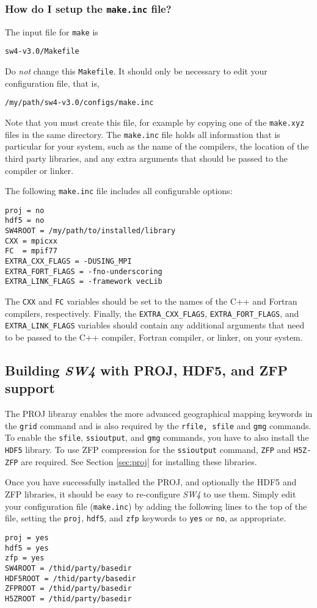 \documentclass[11pt]{article}
\begin{document}
\subsubsection{How do I setup the {\tt make.inc} file?}

The input file for \verb+make+ is
\begin{verbatim}
sw4-v3.0/Makefile
\end{verbatim}
Do {\em not} change this \verb+Makefile+. It should only be necessary to edit your configuration
file, that is,
\begin{verbatim}
/my/path/sw4-v3.0/configs/make.inc
\end{verbatim}
Note that you must create this file, for example by copying one of the \verb+make.xyz+ files in the
same directory. The \verb+make.inc+ file holds all information that is particular for your system,
such as the name of the compilers, the location of the third party libraries, and any extra
arguments that should be passed to the compiler or linker. 

The following \verb+make.inc+ file includes all configurable options:
\begin{verbatim}
proj = no
hdf5 = no
SW4ROOT = /my/path/to/installed/library
CXX = mpicxx
FC  = mpif77
EXTRA_CXX_FLAGS = -DUSING_MPI
EXTRA_FORT_FLAGS = -fno-underscoring
EXTRA_LINK_FLAGS = -framework vecLib
\end{verbatim}
The \verb+CXX+ and \verb+FC+ variables should be set to the names of the C++ and
Fortran compilers, respectively. Finally, the \verb+EXTRA_CXX_FLAGS+, \verb+EXTRA_FORT_FLAGS+, and
\verb+EXTRA_LINK_FLAGS+ variables should contain any additional arguments that need to be passed to
the C++ compiler, Fortran compiler, or linker, on your system.

\subsection{Building \emph{SW4} with PROJ, HDF5, and ZFP support}
The PROJ libraray enables the more advanced geographical mapping keywords in the {\tt grid} command and is also required by the {\tt rfile, sfile} and {\tt gmg} commands. To enable the {\tt sfile}, {\tt ssioutput}, and {\tt gmg} commands, you have to also install the {\tt HDF5} library. To use ZFP compression for the {\tt ssioutput} command, {\tt ZFP} and {\tt H5Z-ZFP} are required. See Section \ref{sec:proj} for installing these libraries.

Once you have successfully installed the PROJ, and optionally the HDF5 and ZFP libraries, it should be easy to re-configure \emph{SW4} to use them. Simply edit your configuration file (\verb+make.inc+) by adding the following lines to the top of the file, setting the {\tt proj}, {\tt hdf5}, and {\tt zfp} keywords to
{\tt yes} or {\tt no}, as appropriate.
\begin{verbatim}
proj = yes 
hdf5 = yes
zfp = yes
SW4ROOT = /thid/party/basedir
HDF5ROOT = /thid/party/basedir
ZFPROOT = /thid/party/basedir
H5ZROOT = /thid/party/basedir
\end{verbatim}
\end{document}
